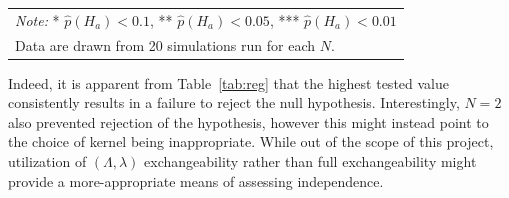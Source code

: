 \begin{table}
\begin{tabular}{|c|c|c|c|}
    \end{tabular}

    \begin{tabular}{p{10cm}}
        \textit{Note:} * $\hat{p}(H_{a}) < 0.1$, ** $\hat{p}(H_{a}) < 0.05$, *** $\hat{p}(H_{a}) < 0.01$
        \\
        Data are drawn from 20 simulations run for each $N$.
    \end{tabular}
\end{table}

Indeed, it is apparent from Table~\ref{tab:reg} that the highest tested value consistently results in a failure to reject
the null hypothesis.
Interestingly, $N=2$ also prevented rejection of the hypothesis, however this might instead point to
the choice of kernel being inappropriate.
While out of the scope of this project, utilization of $(\Lambda,\lambda)$ exchangeability
rather than full exchangeability might provide a more-appropriate means of assessing independence.

